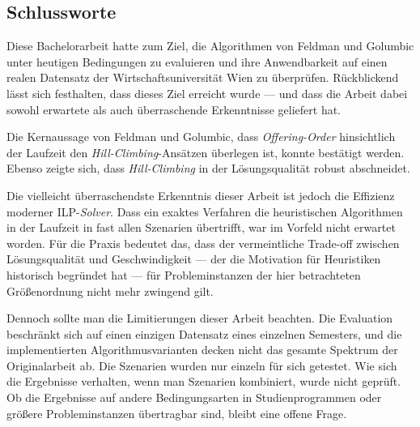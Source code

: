 \subsection{Schlussworte}

Diese Bachelorarbeit hatte zum Ziel, die Algorithmen von Feldman und Golumbic \cite{feldmangolumbic} unter heutigen Bedingungen zu evaluieren und ihre Anwendbarkeit auf einen realen Datensatz der Wirtschaftsuniversität Wien zu überprüfen. Rückblickend lässt sich festhalten, dass dieses Ziel erreicht wurde --- und dass die Arbeit dabei sowohl erwartete als auch überraschende Erkenntnisse geliefert hat.

Die Kernaussage von Feldman und Golumbic, dass \textit{Offering-Order} hinsichtlich der Laufzeit den \textit{Hill-Climbing}-Ansätzen überlegen ist, konnte bestätigt werden. Ebenso zeigte sich, dass \textit{Hill-Climbing} in der Lösungsqualität robust abschneidet.

Die vielleicht überraschendste Erkenntnis dieser Arbeit ist jedoch die Effizienz moderner ILP-\textit{Solver}. Dass ein exaktes Verfahren die heuristischen Algorithmen in der Laufzeit in fast allen Szenarien übertrifft, war im Vorfeld nicht erwartet worden. Für die Praxis bedeutet das, dass der vermeintliche Trade-off zwischen Lösungsqualität und Geschwindigkeit --- der die Motivation für Heuristiken historisch begründet hat --- für Probleminstanzen der hier betrachteten Größenordnung nicht mehr zwingend gilt.

Dennoch sollte man die Limitierungen dieser Arbeit beachten. Die Evaluation beschränkt sich auf einen einzigen Datensatz eines einzelnen Semesters, und die implementierten Algorithmusvarianten decken nicht das gesamte Spektrum der Originalarbeit ab. Die Szenarien wurden nur einzeln für sich getestet. Wie sich die Ergebnisse verhalten, wenn man Szenarien kombiniert, wurde nicht geprüft. Ob die Ergebnisse auf andere Bedingungsarten in Studienprogrammen oder größere Probleminstanzen übertragbar sind, bleibt eine offene Frage.

